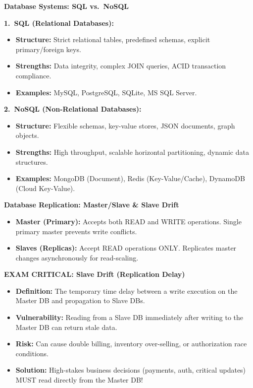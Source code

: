 \documentclass[8pt, a4paper]{article}
\begin{document}
\begin{conceptbox}
\textbf{Database Systems: SQL vs.\ NoSQL}

\medskip
\textbf{1.\ SQL (Relational Databases):}
\begin{itemize}
  \item \textbf{Structure:} Strict relational tables, predefined schemas, explicit primary/foreign keys.
  \item \textbf{Strengths:} Data integrity, complex JOIN queries, ACID transaction compliance.
  \item \textbf{Examples:} MySQL, PostgreSQL, SQLite, MS SQL Server.
\end{itemize}

\textbf{2.\ NoSQL (Non-Relational Databases):}
\begin{itemize}
  \item \textbf{Structure:} Flexible schemas, key-value stores, JSON documents, graph objects.
  \item \textbf{Strengths:} High throughput, scalable horizontal partitioning, dynamic data structures.
  \item \textbf{Examples:} MongoDB (Document), Redis (Key-Value/Cache), DynamoDB (Cloud Key-Value).
\end{itemize}
\end{conceptbox}

\begin{conceptbox}
\textbf{Database Replication: Master/Slave \& Slave Drift}
\begin{itemize}
  \item \textbf{Master (Primary):} Accepts both READ and WRITE operations. Single primary master prevents write conflicts.
  \item \textbf{Slaves (Replicas):} Accept READ operations ONLY. Replicates master changes asynchronously for read-scaling.
\end{itemize}

\medskip
\textbf{EXAM CRITICAL: Slave Drift (Replication Delay)}
\begin{itemize}
  \item \textbf{Definition:} The temporary time delay between a write execution on the Master DB and propagation to Slave DBs.
  \item \textbf{Vulnerability:} Reading from a Slave DB immediately after writing to the Master DB can return stale data.
  \item \textbf{Risk:} Can cause double billing, inventory over-selling, or authorization race conditions.
  \item \textbf{Solution:} High-stakes business decisions (payments, auth, critical updates) MUST read directly from the Master DB!
\end{itemize}
\end{conceptbox}
\end{document}
